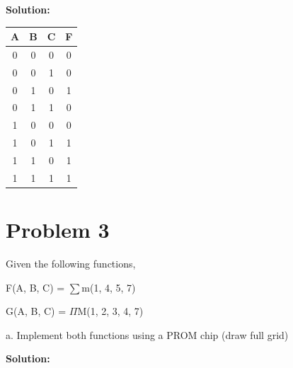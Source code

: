 \documentclass{article}
\begin{document}
    \textbf{Solution:}

    \begin{center}
        \begin{tabular} {ccc|c}
            A & B & C & F \\
            \hline
            0 & 0 & 0 & 0 \\
            0 & 0 & 1 & 0 \\
            0 & 1 & 0 & 1 \\
            0 & 1 & 1 & 0 \\
            1 & 0 & 0 & 0 \\
            1 & 0 & 1 & 1 \\
            1 & 1 & 0 & 1 \\
            1 & 1 & 1 & 1 \\
        \end{tabular}
    \end{center}
    


    \section*{Problem 3}

    Given the following functions,
    \begin{center}
        F(A, B, C) = $\sum$m(1, 4, 5, 7)

        G(A, B, C) = $\Pi$M(1, 2, 3, 4, 7)
    \end{center}

    a. Implement both functions using a PROM chip (draw full grid)

    \textbf{Solution:}
\end{document}
